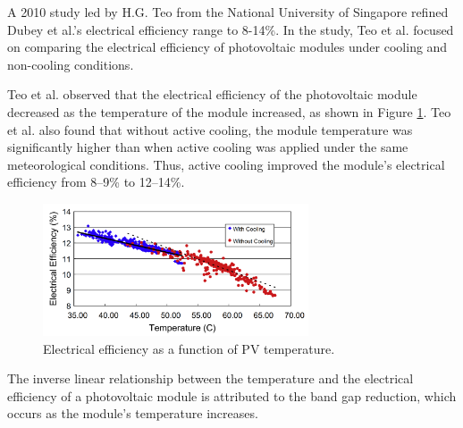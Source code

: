 \noindent A 2010 study led by H.G. Teo from the National University of Singapore refined Dubey et al.'s electrical efficiency range to 8-14\%. In the study, Teo et al. focused on comparing the electrical efficiency of photovoltaic modules under cooling and non-cooling conditions.\par\vspace{0.5em}

\noindent Teo et al. observed that the electrical efficiency of the photovoltaic module decreased as the temperature of the module increased, as shown in Figure \ref{fig:electrical_efficiency_vs_temperature_pv_module}. Teo et al. also found that without active cooling, the module temperature was significantly higher than when active cooling was applied under the same meteorological conditions. Thus, active cooling improved the module’s electrical efficiency from 8–9\% to 12–14\%. \cite{Teo2012AnModules}

\begin{figure}[ht]
    \centering
    \includegraphics[width=0.7\textwidth]{Figures/electrical_efficiency_vs_temperature_pv_module.png}
    \caption{Electrical efficiency as a function of PV temperature. \cite{Teo2012AnModules}}
    \label{fig:electrical_efficiency_vs_temperature_pv_module}
\end{figure}
\FloatBarrier

\noindent The inverse linear relationship between the temperature and the electrical efficiency of a photovoltaic module is attributed to the band gap reduction, which occurs as the module's temperature increases.\vspace{0.5em}

